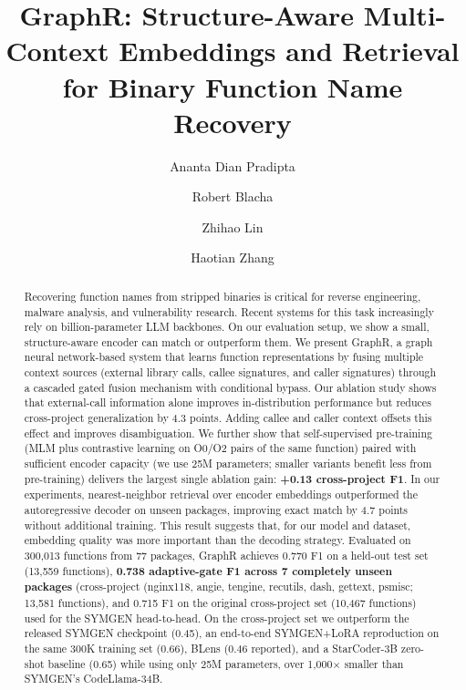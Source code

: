 \documentclass[sigconf,nonacm]{acmart}
\newcommand{\sysname}{\textsf{GraphR}}
\begin{document}
\title{{\normalfont\sysname{}}: Structure-Aware Multi-Context Embeddings and Retrieval for Binary Function Name Recovery}

\author{Ananta Dian Pradipta}

\author{Robert Blacha}

\author{Zhihao Lin}

\author{Haotian Zhang}

\begin{abstract}
Recovering function names from stripped binaries is critical for reverse engineering, malware analysis, and vulnerability research. Recent systems for this task increasingly rely on billion-parameter LLM backbones. On our evaluation setup, we show a small, structure-aware encoder can match or outperform them. We present \sysname{}, a graph neural network-based system that learns function representations by fusing multiple context sources (external library calls, callee signatures, and caller signatures) through a cascaded gated fusion mechanism with conditional bypass. Our ablation study shows that external-call information alone improves in-distribution performance but reduces cross-project generalization by 4.3 points. Adding callee and caller context offsets this effect and improves disambiguation. We further show that self-supervised pre-training (MLM plus contrastive learning on O0/O2 pairs of the same function) paired with sufficient encoder capacity (we use 25M parameters; smaller variants benefit less from pre-training) delivers the largest single ablation gain: \textbf{+0.13 cross-project F1}. In our experiments, nearest-neighbor retrieval over encoder embeddings outperformed the autoregressive decoder on unseen packages, improving exact match by 4.7 points without additional training. This result suggests that, for our model and dataset, embedding quality was more important than the decoding strategy. Evaluated on 300{,}013 functions from 77 packages, \sysname{} achieves 0.770 F1 on a held-out test set (13{,}559 functions), \textbf{0.738 adaptive-gate F1 across 7 completely unseen packages} (cross-project (nginx118, angie, tengine, recutils, dash, gettext, psmisc; 13{,}581 functions), and 0.715 F1 on the original cross-project set (10{,}467 functions) used for the SYMGEN head-to-head. On the cross-project set we outperform the released SYMGEN checkpoint (0.45), an end-to-end SYMGEN+LoRA reproduction on the same 300K training set (0.66), BLens (0.46 reported), and a StarCoder-3B zero-shot baseline (0.65) while using only 25M parameters, over 1{,}000$\times$ smaller than SYMGEN's CodeLlama-34B.
\end{abstract}
\end{document}
